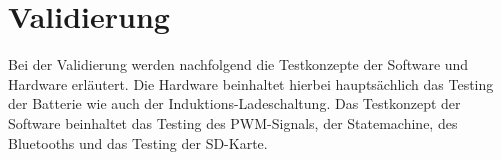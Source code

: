\section{Validierung} \label{sec:validierung}

Bei der Validierung werden nachfolgend die Testkonzepte der Software und Hardware erläutert. Die Hardware beinhaltet hierbei hauptsächlich das Testing der Batterie wie auch der Induktions-Ladeschaltung. Das Testkonzept der Software beinhaltet das Testing des PWM-Signals, der Statemachine, des Bluetooths und das Testing der SD-Karte.